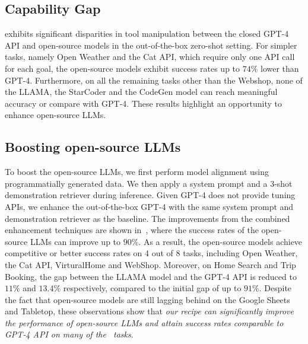 \subsection{Capability Gap}
\label{subsec:cap_gap}
 exhibits significant disparities in tool manipulation between the closed GPT-4 API and open-source models in the out-of-the-box zero-shot setting. 
For simpler tasks, namely Open Weather and the Cat API, which require only one API call for each goal, the open-source models exhibit success rates up to $74\%$ lower than GPT-4. 
Furthermore, on all the remaining tasks other than the Webshop, none of the LLAMA, the StarCoder and the CodeGen model can reach meaningful accuracy or compare with GPT-4. 
These results highlight an opportunity to enhance open-source LLMs.


\subsection{Boosting open-source LLMs}
\label{subsec:boost}
To boost the open-source LLMs, we first perform model alignment using programmatially generated data. We then apply a system prompt and a 3-shot demonstration retriever during inference. Given GPT-4 does not provide tuning APIs, we enhance the out-of-the-box GPT-4 with the same system prompt and demonstration retriever as the baseline. The improvements from the combined enhancement techniques are shown in~, where the success rates of the open-source LLMs can improve up to $90\%$. As a result, the open-source models achieve competitive or better success rates on 4 out of 8 tasks, including Open Weather, the Cat API, VirturalHome and WebShop. Moreover, on Home Search and Trip Booking, the gap between the LLAMA model and the GPT-4 API is reduced to $11\%$ and $13.4\%$ respectively, compared to the initial gap of up to $91\%$. Despite the fact that open-source models are still lagging behind on the Google Sheets and Tabletop, these observations show that \emph{our recipe can significantly improve the performance of open-source LLMs and attain success rates comparable to GPT-4 API on many of the \snact\  tasks}.

